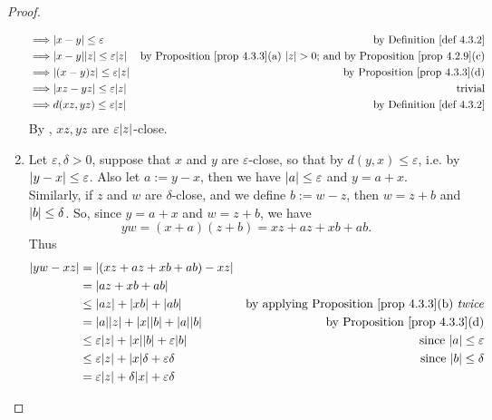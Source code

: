 \begin{proof}
\begin{enumerate}
\begin{align*}
            \implies & \abs{x - y} \le \varepsilon & \text{by \DEF{4.3.2}} \\
            \implies & \abs{x - y}\abs{z} \le \varepsilon\abs{z} & \text{by \PROP{4.3.3}(a) \(\abs{z} > 0\); and by \PROP{4.2.9}(c)} \\
            \implies & \abs{(x - y)z} \le \varepsilon\abs{z} & \text{by \PROP{4.3.3}(d)} \\
            \implies & \abs{xz - yz} \le \varepsilon\abs{z} & \text{trivial} \\
            \implies & d(xz, yz) \le \varepsilon\abs{z} & \text{by \DEF{4.3.2}} \\
        \end{align*}
        By , \(xz, yz\) are \(\varepsilon\lvert z\rvert\)-close.
    \item
        Let \(\varepsilon, \delta > 0\), suppose that \(x\) and \(y\) are \(\varepsilon\)-close, so that by  \(d(y, x) \le \varepsilon\), i.e. by  \(\lvert y - x\rvert \le \varepsilon\).
        Also let \(a := y - x\), then we have \(\lvert a\rvert \le \varepsilon\) and \(y = a + x\).
        Similarly, if \(z\) and \(w\) are \(\delta\)-close, and we define \(b := w - z\), then \(w = z + b\) and \(\lvert b\rvert \le \delta\).
        So, since \(y = a + x\) and \(w = z + b\), we have
        \[
            yw = (x + a)(z + b) = xz + az + xb + ab.
        \]
        Thus
        \begin{align*}
            \abs{yw - xz} & = \abs{(xz + az + xb + ab) - xz} \\
                          & = \abs{az + xb + ab} \\
                          & \le \abs{az} + \abs{xb} + \abs{ab} & \text{by applying \PROP{4.3.3}(b) \emph{twice}} \\
                          & = \abs{a}\abs{z} + \abs{x}\abs{b} + \abs{a}\abs{b} & \text{by \PROP{4.3.3}(d)} \\
                          & \le \varepsilon\abs{z} + \abs{x}\abs{b} + \varepsilon\abs{b} & \text{since \(\abs{a} \le \varepsilon\)} \\
                          & \le \varepsilon\abs{z} + \abs{x}\delta + \varepsilon\delta & \text{since \(\abs{b} \le \delta\)} \\
                          & = \varepsilon\abs{z} + \delta\abs{x} + \varepsilon\delta
        \end{align*}
\end{enumerate}
\end{proof}

